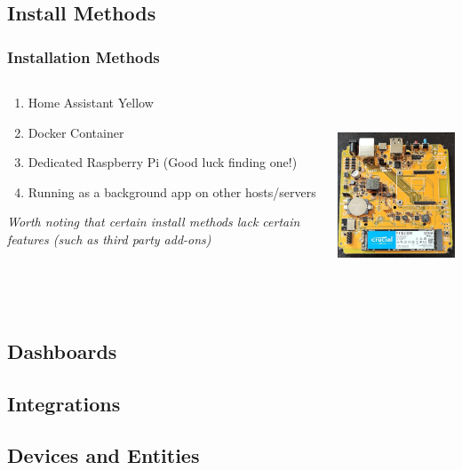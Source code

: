 \documentclass[aspectratio=169]{beamer}
\begin{document}
\subsection{Install Methods}
\begin{frame}[fragile]
  \frametitle{Installation Methods}
  \begin{columns}[]
    \begin{column}[T]{0.45\paperwidth}
      \begin{enumerate}%
        \item{Home Assistant Yellow}
        \item{Docker Container}
        \item{Dedicated Raspberry Pi \tiny{(Good luck finding one!)}}
        \item{Running as a background app on other hosts/servers}
      \end{enumerate}
      \emph{Worth noting that certain install methods lack certain features (such as third party add-ons)}
    \end{column}
    \begin{column}[T]{0.45\paperwidth}
      \includegraphics[height=6cm,keepaspectratio]{images/yellow.jpg}
    \end{column}
  \end{columns}
\end{frame}
\subsection{Dashboards}
\frame{\subsectionpage}
\subsection{Integrations}
\frame{\subsectionpage}
\subsection{Devices and Entities}
\frame{\subsectionpage}
\end{document}
